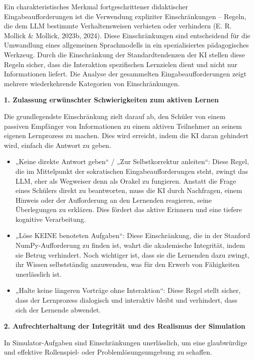 \documentclass[
  ngerman,
  letterpaper,
  DIV=11]{scrreprt}
\begin{document}
Ein charakteristisches Merkmal fortgeschrittener didaktischer
Eingabeaufforderungen ist die Verwendung expliziter Einschränkungen --
Regeln, die dem LLM bestimmte Verhaltensweisen verbieten oder verhindern
(E. R. Mollick \& Mollick, 2023b, 2024). Diese Einschränkungen sind
entscheidend für die Umwandlung eines allgemeinen Sprachmodells in ein
spezialisiertes pädagogisches Werkzeug. Durch die Einschränkung der
Standardtendenzen der KI stellen diese Regeln sicher, dass die
Interaktion spezifischen Lernzielen dient und nicht nur Informationen
liefert. Die Analyse der gesammelten Eingabeaufforderungen zeigt mehrere
wiederkehrende Kategorien von Einschränkungen.

\textbf{1. Zulassung erwünschter Schwierigkeiten zum aktiven Lernen}

Die grundlegendste Einschränkung zielt darauf ab, den Schüler von einem
passiven Empfänger von Informationen zu einem aktiven Teilnehmer an
seinem eigenen Lernprozess zu machen. Dies wird erreicht, indem die KI
daran gehindert wird, einfach die Antwort zu geben.

\begin{itemize}
\item
  „Keine direkte Antwort geben`` / „Zur Selbstkorrektur anleiten``:
  Diese Regel, die im Mittelpunkt der sokratischen Eingabeaufforderungen
  steht, zwingt das LLM, eher als Wegweiser denn als Orakel zu
  fungieren. Anstatt die Frage eines Schülers direkt zu beantworten,
  muss die KI durch Nachfragen, einem Hinweis oder der Aufforderung an
  den Lernenden reagieren, seine Überlegungen zu erklären. Dies fördert
  das aktive Erinnern und eine tiefere kognitive Verarbeitung.
\item
  „Löse KEINE benoteten Aufgaben``: Diese Einschränkung, die in der
  Stanford NumPy-Aufforderung zu finden ist, wahrt die akademische
  Integrität, indem sie Betrug verhindert. Noch wichtiger ist, dass sie
  die Lernenden dazu zwingt, ihr Wissen selbstständig anzuwenden, was
  für den Erwerb von Fähigkeiten unerlässlich ist.
\item
  „Halte keine längeren Vorträge ohne Interaktion``: Diese Regel stellt
  sicher, dass der Lernprozess dialogisch und interaktiv bleibt und
  verhindert, dass sich der Lernende abwendet.
\end{itemize}

\textbf{2. Aufrechterhaltung der Integrität und des Realismus der
Simulation}

In Simulator-Aufgaben sind Einschränkungen unerlässlich, um eine
glaubwürdige und effektive Rollenspiel- oder Problemlösungsumgebung zu
schaffen.
\end{document}
